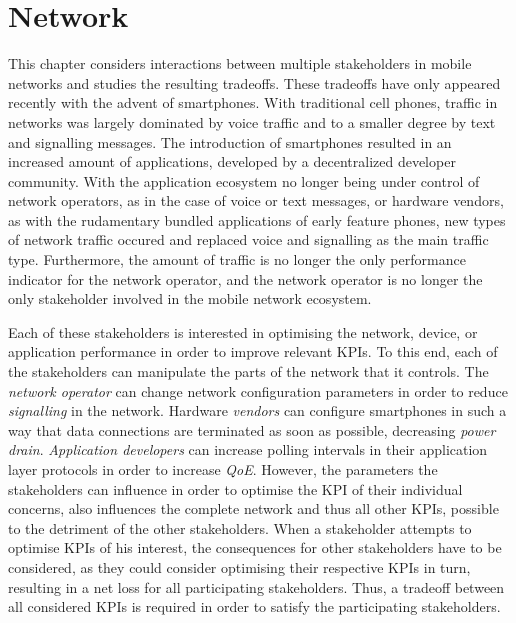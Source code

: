 \chapter{Network}\label{chap:network}
This chapter considers interactions between multiple stakeholders in mobile networks and studies the resulting tradeoffs.
These tradeoffs have only appeared recently with the advent of smartphones.
With traditional cell phones, traffic in networks was largely dominated by voice traffic and to a smaller degree by text and signalling messages.
The introduction of smartphones resulted in an increased amount of applications, developed by a decentralized developer community.
With the application ecosystem no longer being under control of network operators, as in the case of voice or text messages, or hardware vendors, as with the rudamentary bundled applications of early feature phones, new types of network traffic occured and replaced voice and signalling as the main traffic type.
Furthermore, the amount of traffic is no longer the only performance indicator for the network operator, and the network operator is no longer the only stakeholder involved in the mobile network ecosystem.

Each of these stakeholders is interested in optimising the network, device, or application performance in order to improve relevant \glspl{KPI}.
To this end, each of the stakeholders can manipulate the parts of the network that it controls.
The \emph{network operator} can change network configuration parameters in order to reduce \emph{signalling} in the network.
Hardware \emph{vendors} can configure smartphones in such a way that data connections are terminated as soon as possible, decreasing \emph{power drain}.
\emph{Application developers} can increase polling intervals in their application layer protocols in order to increase \emph{\gls{QoE}}.	
However, the parameters the stakeholders can influence in order to optimise the \gls{KPI} of their individual concerns, also influences the complete network and thus all other \glspl{KPI}, possible to the detriment of the other stakeholders.
When a stakeholder attempts to optimise \glspl{KPI} of his interest, the consequences for other stakeholders have to be considered, as they could consider optimising their respective \glspl{KPI} in turn, resulting in a net loss for all participating stakeholders.
Thus, a tradeoff between all considered \glspl{KPI} is required in order to satisfy the participating stakeholders.

